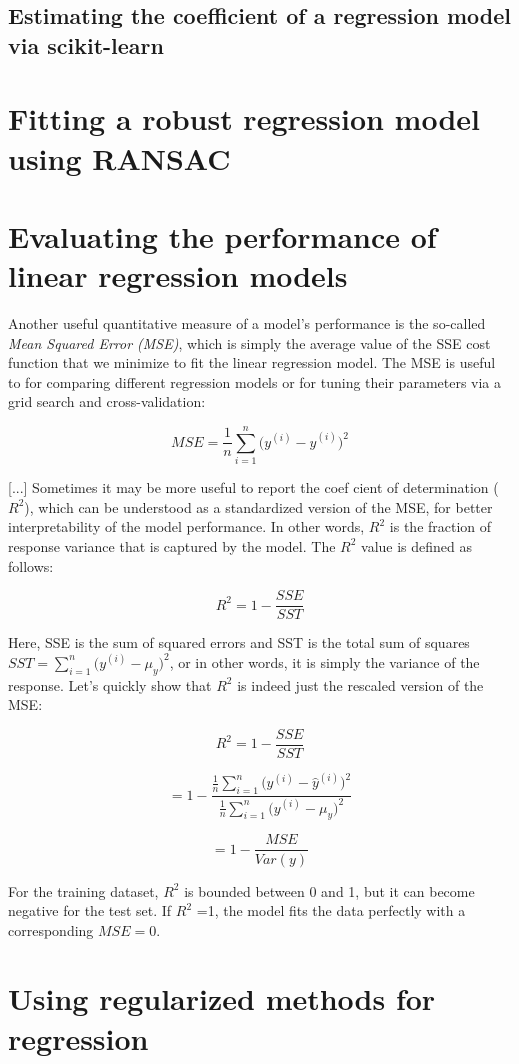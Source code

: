 \documentclass[letterpaper]{report}
\begin{document}
\subsection{Estimating the coefficient of a regression model via scikit-learn}
\section{Fitting a robust regression model using RANSAC}
\section{Evaluating the performance of linear regression models}

Another useful quantitative measure of a model's performance is the so-called \textit{Mean Squared Error (MSE)}, which is simply the average value of the SSE cost function that we minimize to  fit the linear regression model. The MSE is useful to for comparing different regression models or for tuning their parameters via a grid search and cross-validation:

\[
MSE = \frac{1}{n} \sum_{i=1}^{n} \big( y^{(i)} - \hat{y}^{(i)}  \big)^2
\]

[...] Sometimes it may be more useful to report the coef cient of determination ($R^2$), which can be understood as a standardized version of the MSE, for better interpretability of the model performance. In other words, $R^2$ is the fraction of response variance that is captured by the model. The $R^2$ value is defined as follows:

\[
R^2 = 1 - \frac{SSE}{SST}
\]

Here, SSE is the sum of squared errors and SST is the total sum of squares $SST = \sum^{n}_{i=1} \big( y^{(i)} - \mu_y \big)^2$, or in other words, it is simply the variance of the response. Let's quickly show that $R^2$ is indeed just the rescaled version of the MSE:

\[
R^2 = 1 - \frac{SSE}{SST}
\]

\[
= 1 - \frac{\frac{1}{n} \sum^{n}_{i=1} \big( y^{(i)} - \hat{y}^{(i)}  \big)^2 }{\frac{1}{n} \sum_{i=1}^{n} \big( y^{(i)} - \mu_y \big)^2 }
\]
 
\[
= 1 - \frac{MSE}{Var(y)}
\]

For the training dataset, $R^2$ is bounded between 0 and 1, but it can become negative for the test set. If $R^2$ =1, the model  fits the data perfectly with a
corresponding $MSE = 0$.

\section{Using regularized methods for regression}
\end{document}
